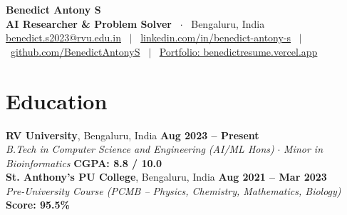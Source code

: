 \documentclass[10pt,a4paper]{article}
\begin{document}
\begin{center}
  {\Huge \textbf{\color{primary} Benedict Antony S}} \\ \vspace{2pt}
  {\small \textbf{AI Researcher \& Problem Solver} \ $\cdot$ \ Bengaluru, India} \\ \vspace{2pt}
  {\footnotesize
    \href{mailto:benedict.s2023@rvu.edu.in}{benedict.s2023@rvu.edu.in} \ $|$ \ 
    \href{https://linkedin.com/in/benedict-antony-s-4172242a7}{linkedin.com/in/benedict-antony-s} \ $|$ \ 
    \href{https://github.com/BenedictAntonyS}{github.com/BenedictAntonyS} \ $|$ \ 
    \href{https://benedictresume.vercel.app}{Portfolio: benedictresume.vercel.app}
  }
\end{center}
\vspace{-10pt}

\section{Education}
\noindent
\textbf{RV University}, Bengaluru, India \hfill \textbf{Aug 2023 -- Present} \\
\textit{B.Tech in Computer Science and Engineering (AI/ML Hons)} $\cdot$ \textit{Minor in Bioinformatics} \hfill \textbf{CGPA: 8.8 / 10.0} \\
\vspace{1.5pt}
\textbf{St. Anthony's PU College}, Bengaluru, India \hfill \textbf{Aug 2021 -- Mar 2023} \\
\textit{Pre-University Course (PCMB -- Physics, Chemistry, Mathematics, Biology)} \hfill \textbf{Score: 95.5\%}
\vspace{-3pt}

\end{document}
